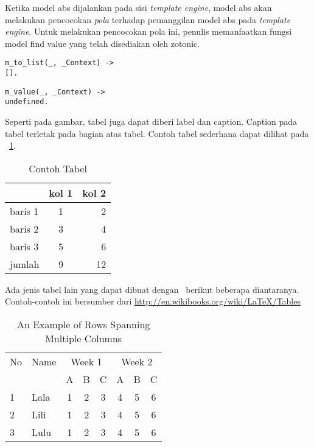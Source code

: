 Ketika model abs dijalankan pada sisi \textit{template engine}, model abs akan melakukan pencocokan \textit{pola} terhadap pemanggilan model abs pada \textit{template engine}. Untuk melakukan pencocokan pola ini, penulis memanfaatkan fungsi model find value yang telah disediakan oleh zotonic.

\begin{minipage}{\linewidth}
\begin{lstlisting}[caption={Implementasi fungsi m to list},label={lst:mtolist}]
m_to_list(_, _Context) ->
[].
\end{lstlisting}
\end{minipage}

\begin{minipage}{\linewidth}
\begin{lstlisting}[caption={Implementasi fungsi m value},label={lst:mvalue}]
m_value(_, _Context) ->
undefined.
\end{lstlisting}
\end{minipage}
Seperti pada gambar, tabel juga dapat diberi label dan caption. 
Caption pada tabel terletak pada bagian atas tabel. 
Contoh tabel sederhana dapat dilihat pada \tab~\ref{tab:tab1}.

\begin{table}
	\centering
	\caption{Contoh Tabel}
	\label{tab:tab1}
	\begin{tabular}{| l | c r |}
		\hline
		& kol 1 & kol 2 \\ 
		\hline
		baris 1 & 1 & 2 \\
		baris 2 & 3 & 4 \\
		baris 3 & 5 & 6 \\
		jumlah  & 9 & 12 \\
		\hline
	\end{tabular}
\end{table}

Ada jenis tabel lain yang dapat dibuat dengan \latex~berikut 
beberapa diantaranya. 
Contoh-contoh ini bersumber dari 
\url{http://en.wikibooks.org/wiki/LaTeX/Tables}

\begin{table}
	\centering
	\caption{An Example of Rows Spanning Multiple Columns}
	\label{row.spanning}
	\begin{tabular}{|l|l|*{6}{c|}}
  		\hline %
  		No & Name & \multicolumn{3}{|c|}{Week 1} & \multicolumn{3}{|c|}{Week 2} \\
  		\cline{3-8} %
  		& & A & B & C & A & B & C\\
  		\hline
  		1 & Lala & 1 & 2 & 3 & 4 & 5 & 6\\
  		2 & Lili & 1 & 2 & 3 & 4 & 5 & 6\\
  		3 & Lulu & 1 & 2 & 3 & 4 & 5 & 6\\
  		\hline
	\end{tabular}
\end{table}

